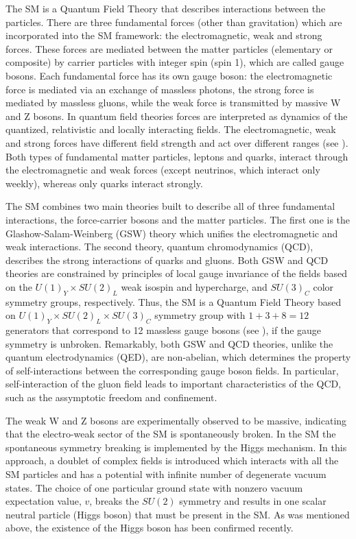 The SM is a Quantum Field Theory that describes interactions between the particles.
There are three fundamental forces (other than gravitation) which are incorporated into the SM framework: the electromagnetic, weak and strong forces. These forces are mediated between the matter particles (elementary or composite) by carrier particles with integer spin (spin 1), which are called gauge bosons.
Each fundamental force has its own gauge boson: the electromagnetic force is mediated via an exchange of massless photons, the strong force is mediated by massless gluons, while the weak force is transmitted by massive W and Z bosons.
In quantum field theories forces are interpreted as dynamics of the quantized, relativistic and locally interacting fields.
The electromagnetic, weak and strong forces have different field strength and act over different ranges (see ). 
Both types of fundamental matter particles, leptons and quarks, interact through the electromagnetic and weak forces (except neutrinos, which interact only weekly), whereas only quarks interact strongly.

The SM combines two main theories built to describe all of three fundamental interactions, the force-carrier bosons and the matter particles. The first one is the Glashow-Salam-Weinberg (GSW) theory which unifies the electromagnetic and weak interactions. The second theory, quantum chromodynamics (QCD), describes the strong interactions of quarks and gluons. Both GSW and QCD theories are constrained by principles of local gauge invariance of the fields based on the $U(1)_Y\times SU(2)_{L}$ weak isospin and hypercharge, and $SU(3)_C$ color symmetry groups, respectively. Thus, the SM is a Quantum Field Theory based on $U(1)_Y\times SU(2)_{L}\times SU(3)_C$ symmetry group with $1+3+8=12$ generators that correspond to 12 massless gauge bosons (see ), if the gauge symmetry is unbroken. 
Remarkably, both GSW and QCD theories, unlike the quantum electrodynamics (QED), are non-abelian, which determines the property of self-interactions between the corresponding gauge boson fields. In particular, self-interaction of the gluon field leads to important characteristics of the QCD, such as the assymptotic freedom and confinement.

The weak W and Z bosons are experimentally observed to be massive, indicating that the electro-weak sector of the SM is spontaneously broken. 
In the SM the spontaneous symmetry breaking is implemented by the Higgs mechanism. In this approach,
a doublet of complex fields is introduced which interacts with all the SM particles and has a potential with infinite number of degenerate vacuum states. 
The choice of one particular ground state with nonzero vacuum expectation value, $v$, breaks the $SU(2)$ symmetry and results in one scalar neutral particle (Higgs boson) that must be present in the SM. As was mentioned above, the existence of the Higgs boson has been confirmed recently.


